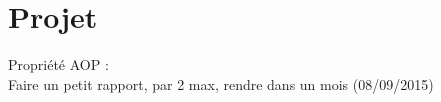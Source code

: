 \section{Projet}
Propriété AOP :\\
Faire un petit rapport, par 2 max, rendre dans un mois (08/09/2015)\\
